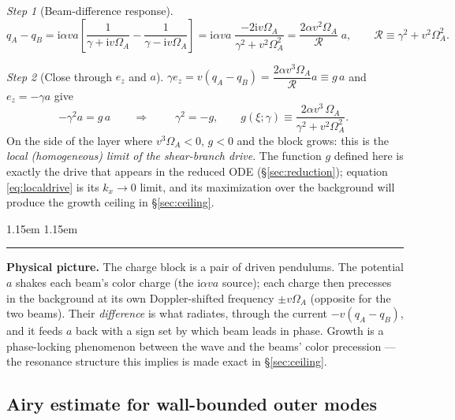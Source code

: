 \documentclass[11pt,a4paper]{article}
\numberwithin{equation}{section}
\theoremstyle{remark}
\newtheorem{step}{Step}[subsection]
\newenvironment{intuition}%
{\par\medskip\noindent
 \begin{list}{}{\leftmargin 1.15em \rightmargin 1.15em \listparindent 0pt
 \itemindent 0pt \parsep 2pt \topsep 2pt}\item\relax
 \small\textcolor{intu}{\rule[-0.6ex]{2.6pt}{2.4ex}}\hspace{0.55em}%
 \textcolor{intu}{\textbf{Physical picture.}}\hspace{0.5em}\ignorespaces}%
{\end{list}\medskip}
\newcommand{\OmA}{\Omega_A}
\newcommand{\R}{\mathcal{R}}
\newcommand{\ii}{\mathrm{i}}
\begin{document}
\begin{step}[Beam-difference response]
\begin{equation}
q_A-q_B=\ii\alpha v a
\left[\frac{1}{\gamma+\ii v\OmA}-\frac{1}{\gamma-\ii v\OmA}\right]
=\ii\alpha v a\;\frac{-2\ii v\OmA}{\gamma^2+v^2\OmA^2}
=\frac{2\alpha v^2\OmA}{\R}\;a,
\qquad
\R\equiv\gamma^2+v^2\OmA^2 .
\label{eq:qdiff}
\end{equation}
\end{step}

\begin{step}[Close through $e_z$ and $a$]
$\gamma e_z=v(q_A-q_B)=\dfrac{2\alpha v^3\OmA}{\R}a\equiv g\,a$ and
$e_z=-\gamma a$ give
\begin{equation}
-\gamma^2a=g\,a
\qquad\Longrightarrow\qquad
\boxed{\;\gamma^2=-g,\qquad
g(\xi;\gamma)\equiv\frac{2\alpha v^3\,\OmA}{\gamma^2+v^2\OmA^2}.\;}
\label{eq:localdrive}
\end{equation}
On the side of the layer where $v^3\OmA<0$, $g<0$ and the block grows:
this is the \emph{local (homogeneous) limit of the shear-branch drive}.
The function $g$ defined here is exactly the drive that appears in the
reduced ODE (\S\ref{sec:reduction}); equation \eqref{eq:localdrive} is its
$k_x\to0$ limit, and its maximization over the background will produce the
growth ceiling in \S\ref{sec:ceiling}.
\end{step}

\begin{intuition}
The charge block is a pair of driven pendulums. The potential $a$ shakes
each beam's color charge (the $\ii\alpha v a$ source); each charge then
precesses in the background at its own Doppler-shifted frequency
$\pm v\OmA$ (opposite for the two beams). Their \emph{difference} is what
radiates, through the current $-v(q_A-q_B)$, and it feeds $a$ back with a
sign set by which beam leads in phase. Growth is a phase-locking
phenomenon between the wave and the beams' color precession --- the
resonance structure this implies is made exact in \S\ref{sec:ceiling}.
\end{intuition}

\subsection{Airy estimate for wall-bounded outer modes}
\label{ssec:airy}
\end{document}
